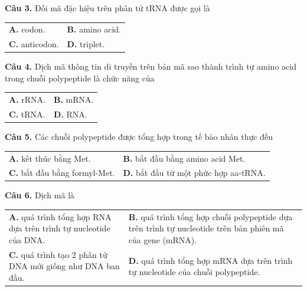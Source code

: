 \documentclass{article}
\begin{document}
\begin{minipage}[t][14.4cm][t]{\linewidth}
\fontsize{25}{33}\selectfont

\textbf{Câu 3.} Đối mã đặc hiệu trên phân tử tRNA được gọi là\\[4pt]
\begin{tabularx}{\linewidth}{@{}X X@{}}
\textbf{A. } codon. & \textbf{B. } amino acid.\\[4pt]
\textbf{C. } anticodon. & \textbf{D. } triplet.
\end{tabularx}
\vspace*{\fill}
\textbf{Câu 4.} Dịch mã thông tin di truyền trên bản mã sao thành trình tự amino acid trong chuỗi polypeptide là chức năng của\\[4pt]
\begin{tabularx}{\linewidth}{@{}X X@{}}
\textbf{A. } rRNA. & \textbf{B. } mRNA.\\[4pt]
\textbf{C. } tRNA. & \textbf{D. } RNA.
\end{tabularx}

\end{minipage}
\newpage


\begin{minipage}[t][14.4cm][t]{\linewidth}
\fontsize{20}{26}\selectfont

\textbf{Câu 5.} Các chuỗi polypeptide được tổng hợp trong tế bào nhân thực đều\\[4pt]
\begin{tabularx}{\linewidth}{@{}X X@{}}
\textbf{A. } kết thúc bằng Met. & \textbf{B. } bắt đầu bằng amino acid Met.\\[4pt]
\textbf{C. } bắt đầu bằng formyl-Met. & \textbf{D. } bắt đầu từ một phức hợp aa-tRNA.
\end{tabularx}
\vspace*{\fill}
\textbf{Câu 6.} Dịch mã là\\[4pt]
\begin{tabularx}{\linewidth}{@{}X X@{}}
\textbf{A. } quá trình tổng hợp RNA dựa trên trình tự nucleotide của DNA. & \textbf{B. } quá trình tổng hợp chuỗi polypeptide dựa trên trình tự nucleotide trên bản phiên mã của gene (mRNA).\\[4pt]
\textbf{C. } quá trình tạo 2 phân tử DNA mới giống như DNA ban đầu. & \textbf{D. } quá trình tổng hợp mRNA dựa trên trình tự nucleotide của chuỗi polypeptide.
\end{tabularx}

\end{minipage}
\newpage
\end{document}
